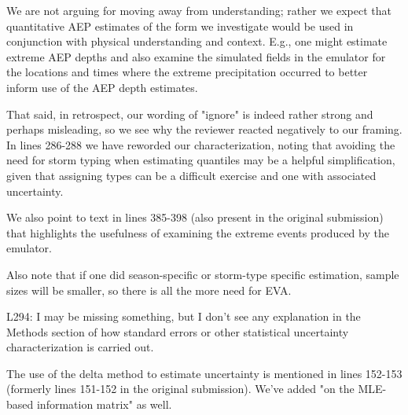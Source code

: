 \documentclass[12pt,english]{reviewresponse}
\begin{document}
\begin{revresponse}
We are not arguing for moving away from understanding; rather we expect that quantitative AEP estimates of the form we investigate would be used in conjunction with physical understanding and context. E.g., one might estimate extreme AEP depths and also examine the simulated fields in the emulator for the locations and times where the extreme precipitation occurred to better inform use of the AEP depth estimates. 

That said, in retrospect, our wording of "ignore" is indeed rather strong and perhaps misleading, so we see why the reviewer reacted negatively to our framing. In lines 286-288 we have reworded our characterization, noting that avoiding the need for storm typing when estimating quantiles may be a helpful simplification, given that assigning types can be a difficult exercise and one with associated uncertainty. 

We also point to text in lines 385-398 (also present in the original submission) that highlights the usefulness of examining the extreme events produced by the emulator.

Also note that if one did season-specific or storm-type specific estimation, sample sizes will be smaller, so there is all the more need for EVA.

\end{revresponse}



\begin{revcomment}
L294: I may be missing something, but I don't see any explanation in the Methods section of how standard errors or other statistical uncertainty characterization is carried out.
    
\end{revcomment}

\begin{revresponse}
The use of the delta method to estimate uncertainty is mentioned in lines 152-153 (formerly lines 151-152 in the original submission). We've added "on the MLE-based information matrix" as well.
\end{revresponse}
\end{document}
